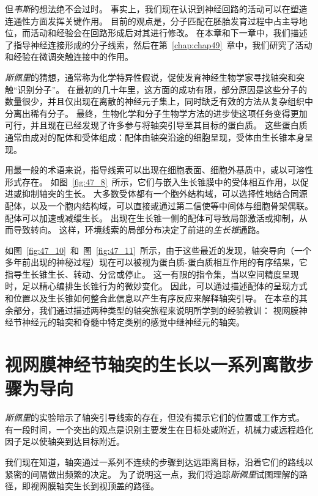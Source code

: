 但\textit{韦斯}的想法绝不会过时。
事实上，我们现在认识到神经回路的活动可以在塑造连通性方面发挥关键作用。
目前的观点是，分子匹配在胚胎发育过程中占主导地位，而活动和经验会在回路形成后对其进行修改。
在本章和下一章中，我们描述了指导神经连接形成的分子线索，然后在第~\ref{chap:chap49}~章中，我们研究了活动和经验在微调突触连接中的作用。


\textit{斯佩里}的猜想，通常称为化学特异性假说，促使发育神经生物学家寻找轴突和突触“识别分子”。
在最初的几十年里，这方面的成功有限，部分原因是这些分子的数量很少，并且仅出现在离散的神经元子集上，同时缺乏有效的方法从复杂组织中分离出稀有分子。
最终，生物化学和分子生物学方法的进步使这项任务变得更加可行，并且现在已经发现了许多参与将轴突引导至其目标的蛋白质。
这些蛋白质通常由成对的配体和受体组成：配体由轴突沿途的细胞呈现，受体由生长锥本身呈现。


用最一般的术语来说，指导线索可以出现在细胞表面、细胞外基质中，或以可溶性形式存在。
如图~\ref{fig:47_8}~所示，它们与嵌入生长锥膜中的受体相互作用，以促进或抑制轴突的生长。
大多数受体都有一个胞外结构域，可以选择性地结合同源配体，以及一个胞内结构域，可以直接或通过第二信使等中间体与细胞骨架偶联。
配体可以加速或减缓生长。
出现在生长锥一侧的配体可导致局部激活或抑制，从而导致转向。
这样，环境线索的局部分布决定了前进的\textit{生长锥}通路。


如图~\ref{fig:47_10}~和~图~\ref{fig:47_11}~所示，由于这些最近的发现，轴突导向（一个多年前出现的神秘过程）现在可以被视为蛋白质-蛋白质相互作用的有序结果，它指导生长锥生长、转动、分岔或停止。
这一有限的指令集，当以空间精度呈现时，足以精心编排生长锥行为的微妙变化。
因此，可以通过描述配体的呈现方式和位置以及生长锥如何整合此信息以产生有序反应来解释轴突引导。
在本章的其余部分，我们通过描述两种类型的轴突旅程来说明所学到的经验教训：
视网膜神经节神经元的轴突和脊髓中特定类别的感觉中继神经元的轴突。



\section{视网膜神经节轴突的生长以一系列离散步骤为导向}

\textit{斯佩里}的实验暗示了轴突引导线索的存在，但没有揭示它们的位置或工作方式。
有一段时间，一个突出的观点是识别主要发生在目标处或附近，机械力或远程趋化因子足以使轴突到达目标附近。


我们现在知道，轴突通过一系列不连续的步骤到达远距离目标，沿着它们的路线以紧密的间隔做出频繁的决定。
为了说明这一点，我们将追踪\textit{斯佩里}试图理解的路径，即视网膜轴突生长到视顶盖的路径。



